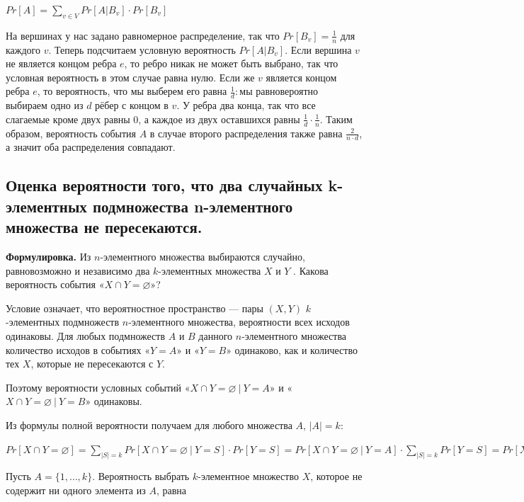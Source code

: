 \documentclass[a4paper, 10pt]{article}
\begin{document}
\begin{center}
    $\displaystyle Pr[A] = \sum_{v \in V} Pr[A | B_v] \cdot Pr[B_v]$
\end{center}

На вершинах у нас задано равномерное распределение, так что $Pr[B_v] = \frac{1}{n}$ для каждого $v$. Теперь подсчитаем условную вероятность $Pr[A | B_v]$. Если вершина $v$ не является концом ребра $e$, то ребро никак не может быть выбрано, так что условная вероятность в этом случае равна нулю. Если же $v$ является концом ребра $e$, то вероятность, что мы выберем его равна $\frac{1}{d}\colon$мы равновероятно выбираем одно из $d$ рёбер с концом в $v$. У ребра два конца, так что все слагаемые кроме двух равны 0, а каждое из двух оставшихся равны $\frac{1}{d} \cdot \frac{1}{n}$. Таким образом, вероятность события $A$ в случае второго распределения также равна $\frac{2}{n \cdot d}$, а значит оба распределения совпадают.

\subsection{Оценка вероятности того, что два случайных k-элементных подмножества n-элементного множества не пересекаются.}

\textbf{Формулировка.} Из $n$-элементного множества выбираются случайно, равновозможно и независимо два $k$-элементных множества $X$ и $Y$ . Какова вероятность события «$X \cap Y = \varnothing$»?

Условие означает, что вероятностное пространство — пары $(X, Y)$ $k$-элементных подмножеств $n$-элементного множества, вероятности всех исходов одинаковы.
Для любых подмножеств $A$ и $B$ данного $n$-элементного множества количество исходов в событиях «$Y = A$» и «$Y = B$» одинаково, как и количество тех $X$, которые не пересекаются с $Y$.

Поэтому вероятности условных событий «$X \cap Y = \varnothing \ | \ Y = A$» и «$X \cap Y = \varnothing \ | \ Y = B$» одинаковы.

Из формулы полной вероятности получаем для любого множества $A$, $|A| = k$:

\begin{center}
    $\displaystyle Pr[X \cap Y = \varnothing] = \sum_{|S| = k} Pr[X \cap Y = \varnothing \ | \ Y = S] \cdot Pr[Y = S] = Pr[X \cap Y = \varnothing \ | \ Y = A] \cdot \sum_{|S| = k} Pr[Y = S] = Pr[X \cap Y = \varnothing \ | \ Y = A]$
\end{center}

Пусть $A = \{1, \dots , k\}$. Вероятность выбрать $k$-элементное множество $X$, которое не содержит ни одного элемента из $A$, равна
\end{document}
